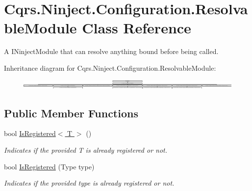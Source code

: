 \hypertarget{classCqrs_1_1Ninject_1_1Configuration_1_1ResolvableModule}{}\section{Cqrs.\+Ninject.\+Configuration.\+Resolvable\+Module Class Reference}
\label{classCqrs_1_1Ninject_1_1Configuration_1_1ResolvableModule}


A I\+Ninject\+Module that can resolve anything bound before being called.  


Inheritance diagram for Cqrs.\+Ninject.\+Configuration.\+Resolvable\+Module\+:\begin{figure}[H]
\begin{center}
\leavevmode
\includegraphics[height=0.506329cm]{classCqrs_1_1Ninject_1_1Configuration_1_1ResolvableModule}
\end{center}
\end{figure}
\subsection*{Public Member Functions}
\begin{DoxyCompactItemize}
\item 
bool \hyperlink{classCqrs_1_1Ninject_1_1Configuration_1_1ResolvableModule_a622339cf7b08ce97d23c9b2f00cedea3_a622339cf7b08ce97d23c9b2f00cedea3}{Is\+Registered$<$ T $>$} ()
\begin{DoxyCompactList}\small\item\em Indicates if the provided {\itshape T}  is already registered or not. \end{DoxyCompactList}\item 
bool \hyperlink{classCqrs_1_1Ninject_1_1Configuration_1_1ResolvableModule_ae5b77cb7b9b0b826a603fea25609a1ac_ae5b77cb7b9b0b826a603fea25609a1ac}{Is\+Registered} (Type type)
\begin{DoxyCompactList}\small\item\em Indicates if the provided {\itshape type}  is already registered or not. \end{DoxyCompactList}\end{DoxyCompactItemize}
